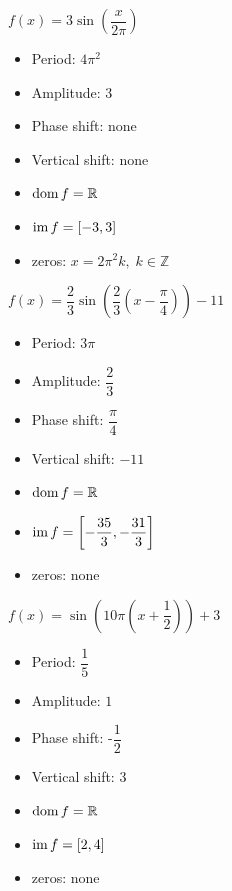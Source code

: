 \begin{Answer}\phantom{}
    \ifanalysis \begin{multicols}{2} \fi
    
    	\Question $f(x)= 3 \sin \left( \dfrac{x}{2 \pi} \right) $
    	\begin{itemize}
    	    \item Period: $4\pi^2$
    	    \item Amplitude: $3$
    	    \item Phase shift: none
    	    \item Vertical shift: none
    	    \item $\text{dom}{\,} f = \mathbb{R}$
    	    \item $\text{im}{\,}f = [-3,3]$
    	    \item zeros: $x=2 \pi^2k, \; k \in \mathbb{Z}$
    	\end{itemize}
    
    \ifcalculus \newpage \fi 
    	\Question $f(x)= \dfrac{2}{3} \sin \left(\dfrac{2}{3} \left( x-\dfrac{\pi}{4}  \right)\right) -11$
    	\begin{itemize}
    	    \item Period: $3\pi$
    	    \item Amplitude: $\dfrac{2}{3}$
    	    \item Phase shift: $\dfrac{\pi}{4}$
    	    \item Vertical shift: $-11$
    	    \item $\text{dom}{\,} f = \mathbb{R}$
    	    \item $\text{im}{\,}f = \left[-\dfrac{35}{3},-\dfrac{31}{3}\right]$
    	    \item zeros: none
    	\end{itemize}
    
    	\Question $f(x)= \sin \left(10 \pi \left( x+\dfrac{1}{2}  \right)\right)+3$
    	\begin{itemize}
    	    \item Period: $\dfrac{1}{5}$
    	    \item Amplitude: $1$
    	    \item Phase shift: -$\dfrac{1}{2}$
    	    \item Vertical shift: $3$
    	    \item $\text{dom}{\,} f = \mathbb{R}$
    	    \item $\text{im}{\,}f = [2,4]$
    	    \item zeros: none
    	\end{itemize}
    	

\end{multicols}
\end{Answer}
